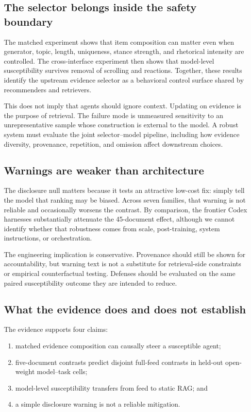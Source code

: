 \documentclass[11pt,letterpaper]{article}
\begin{document}
\subsection{The selector belongs inside the safety boundary}

The matched experiment shows that item composition can matter even when
generator, topic, length, uniqueness, stance strength, and rhetorical intensity
are controlled. The cross-interface experiment then shows that model-level
susceptibility survives removal of scrolling and reactions. Together, these
results identify the upstream evidence selector as a behavioral control
surface shared by recommenders and retrievers.

This does not imply that agents should ignore context. Updating on evidence is
the purpose of retrieval. The failure mode is unmeasured sensitivity to an
unrepresentative sample whose construction is external to the model. A robust
system must evaluate the joint selector--model pipeline, including how evidence
diversity, provenance, repetition, and omission affect downstream choices.

\subsection{Warnings are weaker than architecture}

The disclosure null matters because it tests an attractive low-cost fix:
simply tell the model that ranking may be biased. Across seven families, that
warning is not reliable and occasionally worsens the contrast. By comparison,
the frontier Codex harnesses substantially attenuate the 45-document effect,
although we cannot identify whether that robustness comes from scale,
post-training, system instructions, or orchestration.

The engineering implication is conservative. Provenance should still be shown
for accountability, but warning text is not a substitute for retrieval-side
constraints or empirical counterfactual testing. Defenses should be evaluated
on the same paired susceptibility outcome they are intended to reduce.

\subsection{What the evidence does and does not establish}

The evidence supports four claims:
\begin{enumerate}[leftmargin=*]
  \item matched evidence composition can causally steer a susceptible agent;
  \item five-document contrasts predict disjoint full-feed contrasts in
        held-out open-weight model--task cells;
  \item model-level susceptibility transfers from feed to static RAG; and
  \item a simple disclosure warning is not a reliable mitigation.
\end{enumerate}
\end{document}

